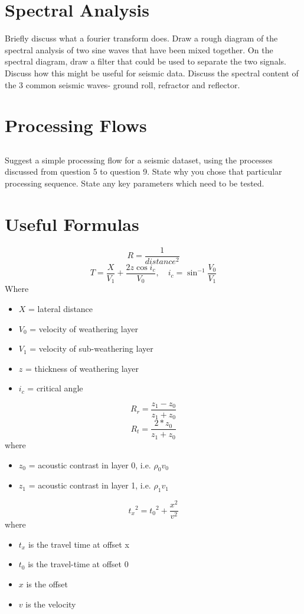 \section{Spectral Analysis}
Briefly discuss what a fourier transform does.  Draw a rough diagram of the spectral analysis of two sine waves that have been mixed together.  On the spectral diagram, draw a filter that could be used to separate the two signals.  Discuss how this might be useful for seismic data.  Discuss the spectral content of the 3 common seismic waves- ground roll, refractor and reflector.
\section{Processing Flows}
\subsection{}
Suggest a simple processing flow for a seismic dataset, using the processes discussed from question 5 to question 9.  State why you chose that particular processing sequence.  State any key parameters which need to be tested.

\newpage
\section{Useful Formulas}
\[R = \frac{1}{distance^2}\]
\[T = \frac{X}{V_1} + \frac{2z \cos{i_c}}{V_0}, \quad i_c = \sin^{-1}{\frac{V_0}{V_1}} \]
Where
\begin{itemize}
\item $X$ = lateral distance
\item $V_0$ = velocity of weathering layer
\item $V_1$ = velocity of sub-weathering layer
\item $z$ = thickness of weathering layer
\item $i_c$ = critical angle
\end{itemize}

\[ R_r = \frac{z_1 - z_0}{z_1+z_0}\]
\[ R_t = \frac{2*z_0}{z_1+z_0}\]
where 
\begin{itemize}
\item $z_0$  = acoustic contrast in layer 0, i.e. $\rho_0 v_0$
\item $z_1$ = acoustic contrast in layer 1, i.e. $\rho_1 v_1$
\end{itemize}

\[ {t_x}^2 = {t_0}^2 + \frac{x^2}{v^2}\]
where
\begin{itemize}
\item $t_x$ is the travel time at offset x
\item $t_0$ is the travel-time at offset 0
\item $x$ is the offset
\item $v$ is the velocity
\end{itemize}



\newpage











